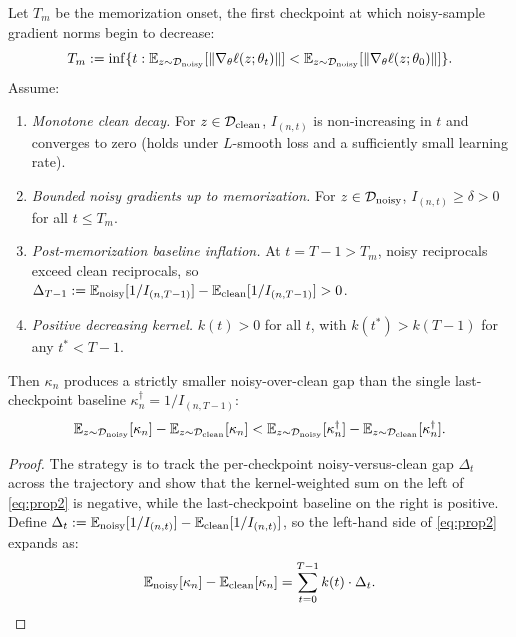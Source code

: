 \begin{foldable}
  \begin{proposition} \label{prop:traj}
    Let $T_m$ be the memorization onset, the first checkpoint at which noisy-sample gradient norms begin to decrease:
    \begin{equation*}
      T_m := \inf\{t : \mathbb{E}_{z \sim \mathcal{D}_\textup{noisy}}[\|\nabla_\theta \ell(z;\theta_t)\|] < \mathbb{E}_{z \sim \mathcal{D}_\textup{noisy}}[\|\nabla_\theta \ell(z;\theta_0)\|]\}.
    \end{equation*}
    Assume:
    \begin{enumerate}[label=\textbf{(A\arabic*)},leftmargin=*]
      \item \textit{Monotone clean decay.} For $z \in \mathcal{D}_\textup{clean}$, $I_{(n,t)}$ is non-increasing in $t$ and converges to zero (holds under $L$-smooth loss and a sufficiently small learning rate).
      \item \textit{Bounded noisy gradients up to memorization.} For $z \in \mathcal{D}_\textup{noisy}$, $I_{(n,t)} \geq \delta > 0$ for all $t \leq T_m$.
      \item \textit{Post-memorization baseline inflation.} At $t = T-1 > T_m$, noisy reciprocals exceed clean reciprocals, so $\Delta_{T-1} := \mathbb{E}_\textup{noisy}[1/I_{(n,T-1)}] - \mathbb{E}_\textup{clean}[1/I_{(n,T-1)}] > 0$.
      \item \textit{Positive decreasing kernel.} $k(t) > 0$ for all $t$, with $k(t^*) > k(T-1)$ for any $t^* < T-1$.
    \end{enumerate}
    Then $\kappa_n$ produces a strictly smaller noisy-over-clean gap than the single last-checkpoint baseline $\kappa^\dagger_n = 1/I_{(n,T-1)}$:
    \begin{equation}
      \mathbb{E}_{z \sim \mathcal{D}_\textup{noisy}}[\kappa_n] - \mathbb{E}_{z \sim \mathcal{D}_\textup{clean}}[\kappa_n]
      < \mathbb{E}_{z \sim \mathcal{D}_\textup{noisy}}[\kappa^\dagger_n] - \mathbb{E}_{z \sim \mathcal{D}_\textup{clean}}[\kappa^\dagger_n].
      \label{eq:prop2}
    \end{equation}
  \end{proposition}
  \begin{proof}
    The strategy is to track the per-checkpoint noisy-versus-clean gap $\Delta_t$ across the trajectory and show that the kernel-weighted sum on the left of \eqref{eq:prop2} is negative, while the last-checkpoint baseline on the right is positive.
    Define $\Delta_t := \mathbb{E}_\textup{noisy}[1/I_{(n,t)}] - \mathbb{E}_\textup{clean}[1/I_{(n,t)}]$, so the left-hand side of \eqref{eq:prop2} expands as:
    \begin{equation*}
      \mathbb{E}_\textup{noisy}[\kappa_n] - \mathbb{E}_\textup{clean}[\kappa_n] = \sum_{t=0}^{T-1} k(t) \cdot \Delta_t.
    \end{equation*}


\end{proof}
\end{foldable}
